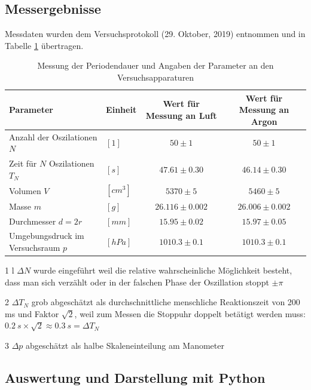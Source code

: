\documentclass[a4paper,10pt]{article}
\begin{document}
\subsection{Messergebnisse}
Messdaten wurden dem Versuchsprotokoll (29. Oktober, 2019) entnommen und in Tabelle \ref{tab:Tab2} übertragen.
\unboldmath
\begin{table}[htb]
\centering
\caption{Messung der Periodendauer und Angaben der Parameter an den Versuchsapparaturen}\label{tab:Tab2}
\begin{threeparttable}
\begin{tabular}{llcc}
\toprule
Parameter & Einheit & Wert für Messung an Luft & Wert für Messung an Argon\\
\midrule
Anzahl der Oszilationen \(N\)&\([1]\)&\(50\pm1\)&\(50\pm1\)\\
Zeit für \(N\) Oszilationen \(T_{N}\)&\([s]\)&\(47.61\pm0.30\)&\(46.14\pm0.30\)\\
Volumen \(V\)&\([{cm}^3]\)&\(5370\pm5\)&\(5460\pm5\)\\
Masse \(m\)&\([g]\)&\(26.116\pm0.002\)&\(26.006\pm0.002\)\\
Durchmesser \(d=2r\)&\([mm]\)&\(15.95\pm0.02\)&\(15.97\pm0.05\)\\
Umgebungsdruck im Versuchsraum \(p\)&\([hPa]\)&\(1010.3\pm0.1\)&\(1010.3\pm0.1\)\\
  \bottomrule
 \end{tabular}
\begin{tablenotes}
\raggedright
\item[1]l \boldmath\(\Delta N\) wurde eingeführt weil die relative wahrscheinliche Möglichkeit besteht, dass man sich verzählt oder in der falschen Phase der  Oszillation stoppt \(\pm\pi\) \unboldmath
\item[2] \boldmath\(\Delta T_{N} \) grob abgeschätzt als durchschnittliche menschliche  Reaktionszeit von 200 ms und Faktor \(\sqrt{2}\), weil zum Messen die Stoppuhr doppelt betätigt werden muss:  \(0.2\:s\times\sqrt{2}\approx0.3\:s = \Delta T_{N} \)\unboldmath
\item[3] \boldmath\(\Delta p \) abgeschätzt als halbe Skaleneinteilung am Manometer\unboldmath
\end{tablenotes}
\end{threeparttable}\end{table}
\boldmath
\subsection{Auswertung und Darstellung mit Python}
\end{document}
